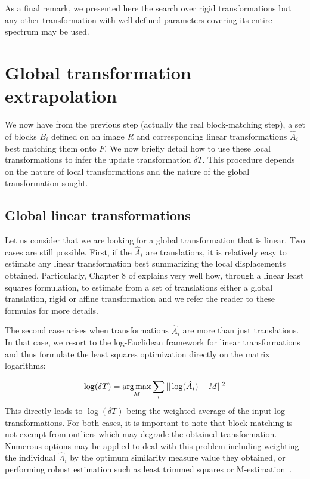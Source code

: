 \documentclass[a4paper]{article}
\def\argmax{\operatornamewithlimits{arg\,max}}
\begin{document}
As a final remark, we presented here the search over rigid transformations but any other transformation with well defined parameters covering its entire spectrum may be used.

\section{Global transformation extrapolation}

We now have from the previous step (actually the real block-matching step), a set of blocks $B_i$ defined on an image $R$ and corresponding linear transformations $\hat{A}_i$ best matching them onto $F$. We now briefly detail how to use these local transformations to infer the update transformation $\delta T$. This procedure depends on the nature of local transformations and the nature of the global transformation sought.

\subsection{Global linear transformations}

Let us consider that we are looking for a global transformation that is linear. Two cases are still possible. First, if the $\hat{A}_i$ are translations, it is relatively easy to estimate any linear transformation best summarizing the local displacements obtained. Particularly, Chapter 8 of \cite{Pennec_PhD_1996} explains very well how, through a linear least squares formulation, to estimate from a set of translations either a global translation, rigid or affine transformation and we refer the reader to these formulas for more details.

The second case arises when transformations $\hat{A}_i$ are more than just translations. In that case, we resort to the log-Euclidean framework for linear transformations~\cite{arsigny:inria-00616084} and thus formulate the least squares optimization directly on the matrix logarithms:

\begin{equation}
	\log(\delta T) = \argmax_{M} \sum_i || \log(\hat{A}_i) - M ||^2
\end{equation}
This directly leads to $\log(\delta T)$ being the weighted average of the input log-transformations. For both cases, it is important to note that block-matching is not exempt from outliers which may degrade the obtained transformation. Numerous options may be applied to deal with this problem including weighting the individual $\hat{A}_i$ by the optimum similarity measure value they obtained, or performing robust estimation such as least trimmed squares or M-estimation~\cite{Rousseeuw_Book_1987}.
\end{document}
